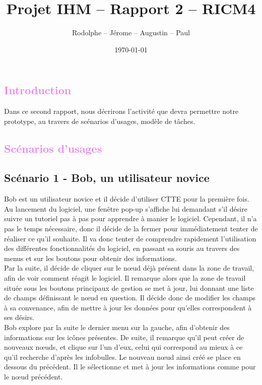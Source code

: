 \documentclass[12pt, a4paper]{article}
\title{Projet IHM -- Rapport 2 -- RICM4}
\author{\bsc{Fréby} Rodolphe -- \bsc{Barbier} Jérome -- \bsc{Husson} Augustin -- \bsc{Labat} Paul}
\date{\today}
\begin{document}
\maketitle
\tableofcontents
\newpage

\textcolor{Violet}{\section{Introduction}}
Dans ce second rapport, nous décrirons l'activité que devra permettre notre prototype, au travers de scénarios d'usages, modèle de tâches.

\textcolor{Violet}{\section{Scénarios d'usages}}
\textcolor{NavyBlue}{\subsection{Scénario 1 - Bob, un utilisateur novice}}


Bob est un utilisateur novice et il décide d'utiliser CTTE pour la première fois. Au lancement du logiciel, une fenêtre pop-up s'affiche lui demandant s’il désire suivre un tutoriel pas à pas pour apprendre à manier le logiciel. Cependant, il n'a pas le temps nécessaire, donc il décide de la fermer pour immédiatement tenter de réaliser ce qu'il souhaite. Il va donc tenter de comprendre rapidement l'utilisation des différentes fonctionnalités du logiciel, en passant sa souris au travers des menus et sur les boutons pour obtenir des informations.\\ 


Par la suite, il décide de cliquer sur le nœud déjà présent dans la zone de travail, afin de voir comment réagit le logiciel. Il remarque alors que la zone de travail située sous les boutons principaux de gestion se met à jour, lui donnant une liste de champs définissant le nœud en question. Il décide donc de modifier les champs à sa convenance, afin de mettre à jour les données pour qu'elles correspondent à ses désirs.\\


Bob explore par la suite le dernier menu sur la gauche, afin d'obtenir des informations sur les icônes présentes. De suite, il remarque qu'il peut créer de nouveaux nœuds, et clique sur l'un d'eux, celui qui correspond au mieux à ce qu'il recherche d'après les infobulles. Le nouveau nœud ainsi créé se place en dessous du précédent. Il le sélectionne et met à jour les informations comme pour le nœud précédent. \\
\end{document}

